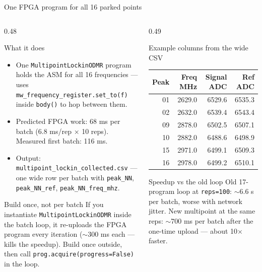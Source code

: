 \documentclass[aspectratio=169,10pt]{beamer}
\newcommand{\code}[1]{\texttt{\scriptsize #1}}
\begin{document}
\begin{frame}{One FPGA program for all 16 parked points}
\vspace{-0.25em}
\begin{columns}[T,totalwidth=\textwidth]
\begin{column}{0.48\textwidth}
\begin{block}{What it does}
\begin{itemize}\setlength{\itemsep}{0.35em}
  \item One \code{MultipointLockinODMR} program holds the ASM for all 16 frequencies — uses \code{mw\_frequency\_register.set\_to(f)} inside \code{body()} to hop between them.
  \item Predicted FPGA work: 68 ms per batch (6.8 ms/rep $\times$ 10 reps). Measured first batch: 116 ms.
  \item Output: \code{multipoint\_lockin\_collected.csv} — one wide row per batch with \code{peak\_NN}, \code{peak\_NN\_ref}, \code{peak\_NN\_freq\_mhz}.
\end{itemize}
\end{block}
\begin{block}{Build once, not per batch}
\scriptsize
If you instantiate \code{MultipointLockinODMR} inside the batch loop, it re-uploads the FPGA program every iteration ($\sim$300 ms each — kills the speedup). Build once outside, then call \code{prog.acquire(progress=False)} in the loop.
\end{block}
\end{column}
\begin{column}{0.49\textwidth}
\begin{block}{Example columns from the wide CSV}
\centering
\tiny
\begin{tabular}{@{}rrrr@{}}
\toprule
Peak & Freq MHz & Signal ADC & Ref ADC \\
\midrule
01 & 2629.0 & 6529.6 & 6535.3 \\
02 & 2632.0 & 6539.4 & 6543.4 \\
09 & 2878.0 & 6502.5 & 6507.1 \\
10 & 2882.0 & 6488.6 & 6498.9 \\
15 & 2971.0 & 6499.1 & 6509.3 \\
16 & 2978.0 & 6499.2 & 6510.1 \\
\bottomrule
\end{tabular}
\end{block}
\begin{block}{Speedup vs the old loop}
\scriptsize
Old 17-program loop at \code{reps=100}: $\sim$6.6 s per batch, worse with network jitter. New multipoint at the same reps: $\sim$700 ms per batch after the one-time upload — about 10$\times$ faster.
\end{block}
\end{column}
\end{columns}
\end{frame}
\end{document}
